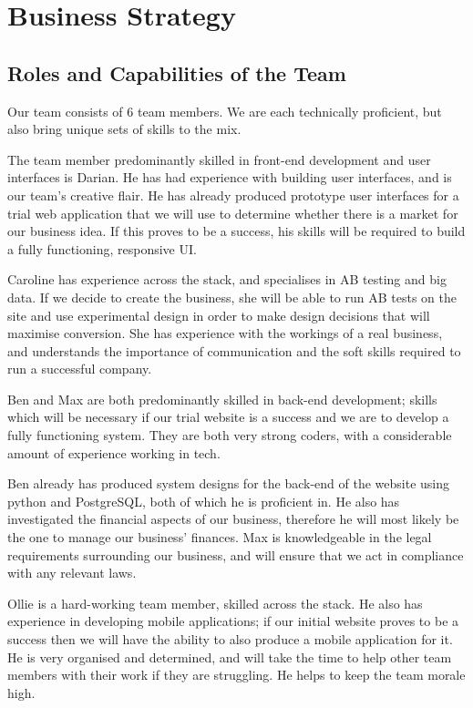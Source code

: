 \documentclass[11pt, a4paper]{article}
\begin{document}
\setlength{\parskip}{6pt}
\setlength{\parindent}{0pt}

\section{Business Strategy}

\subsection{Roles and Capabilities of the Team}

Our team consists of 6 team members. We are each technically proficient, but also bring unique sets of skills to the mix.

The team member predominantly skilled in front-end development and user interfaces is Darian. He has had experience with building user interfaces, and is our team’s creative flair. He has already produced prototype user interfaces for a trial web application that we will use to determine whether there is a market for our business idea. If this proves to be a success, his skills will be required to build a fully functioning, responsive UI.

Caroline has experience across the stack, and specialises in AB testing and big data. If we decide to create the business, she will be able to run AB tests on the site and use experimental design in order to make design decisions that will maximise conversion. She has experience with the workings of a real business, and understands the importance of communication and the soft skills required to run a successful company.

Ben and Max are both predominantly skilled in back-end development; skills which will be necessary if our trial website is a success and we are to develop a fully functioning system. They are both very strong coders, with a considerable amount of experience working in tech.

Ben already has produced system designs for the back-end of the website using python and PostgreSQL, both of which he is proficient in. He also has investigated the financial aspects of our business, therefore he will most likely be the one to manage our business’ finances. Max is knowledgeable in the legal requirements surrounding our business, and will ensure that we act in compliance with any relevant laws.

Ollie is a hard-working team member, skilled across the stack. He also has experience in developing mobile applications; if our initial website proves to be a success then we will have the ability to also produce a mobile application for it. He is very organised and determined, and will take the time to help other team members with their work if they are struggling. He helps to keep the team morale high.
\end{document}

